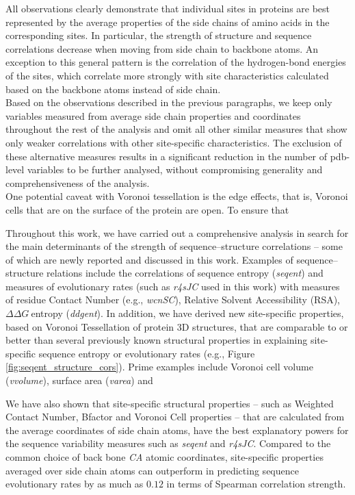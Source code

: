 \documentclass[11pt]{article}
\newcommand{\ddg}{$\Delta\Delta G~$}
\begin{document}
        All observations clearly demonstrate that individual sites in proteins are best represented by the average properties of the side chains of amino acids in the corresponding sites. In particular, the strength of structure and sequence correlations decrease when moving from side chain to backbone atoms. An exception to this general pattern is the correlation of the hydrogen-bond energies of the sites, which correlate more strongly with site characteristics calculated based on the backbone atoms instead of side chain.
        \\

        Based on the observations described in the previous paragraphs, we keep only variables measured from average side chain properties and coordinates throughout the rest of the analysis and omit all other similar measures that show only weaker correlations with other site-specific characteristics. The exclusion of these alternative measures results in a significant reduction in the number of pdb-level variables to be further analysed, without compromising generality and comprehensiveness of the analysis.
        \\

		One potential caveat with Voronoi tessellation is the edge effects, that is, Voronoi cells that are on the surface of the protein are open. To ensure that

        Throughout this work, we have carried out a comprehensive analysis in search for the main determinants of the strength of sequence--structure correlations -- some of which are newly reported and discussed in this work. Examples of sequence--structure relations include the correlations of sequence entropy ({\it seqent}) and measures of evolutionary rates (such as {\it r4sJC} used in this work) with measures of residue Contact Number (e.g., {\it wcnSC}), Relative Solvent Accessibility (RSA), \ddg entropy ({\it ddgent}). In addition, we have derived new site-specific properties, based on Voronoi Tessellation of protein 3D structures, that are comparable to or better than several previously known structural properties in explaining site-specific sequence entropy or evolutionary rates (e.g., Figure \ref{fig:seqent_structure_cors}). Prime examples include Voronoi cell volume ({\it vvolume}), surface area ({\it varea}) and


         We have also shown that site-specific structural properties -- such as Weighted Contact Number, Bfactor and Voronoi Cell properties -- that are calculated from the average coordinates of side chain atoms, have the best explanatory powers for the sequence variability measures such as {\it seqent} and {\it r4sJC}. Compared to the common choice of back bone {\it CA} atomic coordinates, site-specific properties averaged over side chain atoms can outperform in predicting sequence evolutionary rates by as much as $0.12$ in terms of Spearman correlation strength.
\end{document}
